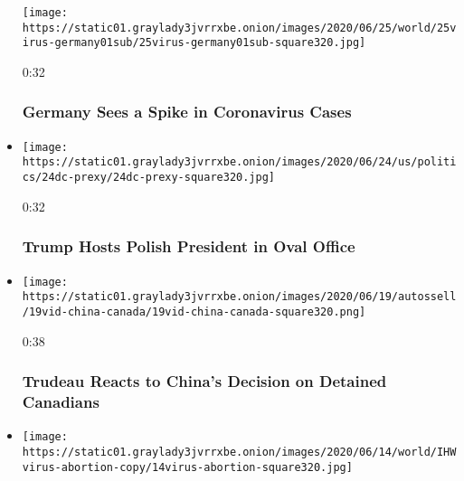 \begin{itemize}
  \texttt{[image: https://static01.graylady3jvrrxbe.onion/images/2020/06/25/world/25virus-germany01sub/25virus-germany01sub-square320.jpg]}

  0:32

  \hypertarget{germany-sees-a-spike-in-coronavirus-cases}{%
  \subsubsection{Germany Sees a Spike in Coronavirus
  Cases}\label{germany-sees-a-spike-in-coronavirus-cases}}
\item
  \href{https://www.nytimes3xbfgragh.onion/video/us/100000007208621/trump-hosts-polish-president.html?action=click\&module=video-series-bar\&region=header\&pgtype=Article\&playlistId=video/world}{}

  \texttt{[image: https://static01.graylady3jvrrxbe.onion/images/2020/06/24/us/politics/24dc-prexy/24dc-prexy-square320.jpg]}

  0:32

  \hypertarget{trump-hosts-polish-president-in-oval-office}{%
  \subsubsection{Trump Hosts Polish President in Oval
  Office}\label{trump-hosts-polish-president-in-oval-office}}
\item
  \href{https://www.nytimes3xbfgragh.onion/video/us/100000007200829/trudeau-china-indictment.html?action=click\&module=video-series-bar\&region=header\&pgtype=Article\&playlistId=video/world}{}

  \texttt{[image: https://static01.graylady3jvrrxbe.onion/images/2020/06/19/autossell/19vid-china-canada/19vid-china-canada-square320.png]}

  0:38

  \hypertarget{trudeau-reacts-to-chinas-decision-on-detained-canadians}{%
  \subsubsection{Trudeau Reacts to China's Decision on Detained
  Canadians}\label{trudeau-reacts-to-chinas-decision-on-detained-canadians}}
\item
  \href{https://www.nytimes3xbfgragh.onion/video/us/100000007199389/women-protest-changes-to-polands-abortion-laws.html?action=click\&module=video-series-bar\&region=header\&pgtype=Article\&playlistId=video/world}{}

  \texttt{[image: https://static01.graylady3jvrrxbe.onion/images/2020/06/14/world/IHWvirus-abortion-copy/14virus-abortion-square320.jpg]}


\end{itemize}
